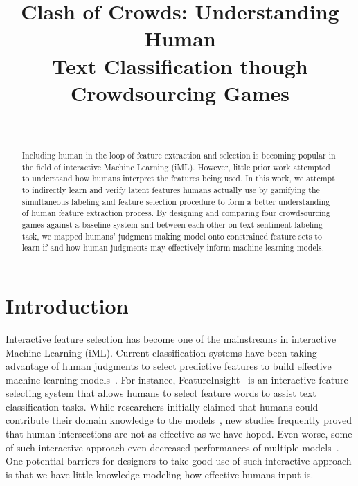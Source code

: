 \documentclass[chi_draft]{sigchi}
\def\plaintitle{Clash of Crowds: Understanding Human \\ Text Classification though Crowdsourcing Games}
\def\plainkeywords{Authors' choice; of terms; separated; by
  semicolons; include commas, within terms only; required.}
\begin{document}
\title{\plaintitle}

\author{%
  \\
}

\maketitle

\begin{abstract}
Including human in the loop of feature extraction and selection is becoming popular in the field of interactive Machine Learning (iML). However, little prior work attempted to understand how humans interpret the features being used. In this work, we attempt to indirectly learn and verify latent features humans actually use by gamifying the simultaneous labeling and feature selection procedure to form a better understanding of human feature extraction process.
By designing and comparing four crowdsourcing games against a baseline system and between each other on text sentiment labeling task, we mapped humans' judgment making model onto constrained feature sets to learn if and how human judgments may effectively inform machine learning models.
\end{abstract}



\section{Introduction}

Interactive feature selection has become one of the mainstreams in interactive Machine Learning (iML).
Current classification systems have been taking advantage of human judgments to select predictive features to build effective machine learning models~\cite{brooks2015featureinsight, cheng2015flock}. 
For instance, FeatureInsight~\cite{brooks2015featureinsight} is an interactive feature selecting system that allows humans to select feature words to assist text classification tasks.
While researchers initially claimed that humans could contribute their domain knowledge to the models~\cite{stumpf2009interacting}, new studies frequently proved that human intersections are not as effective as we have hoped. Even worse, some of such interactive approach even decreased performances of multiple models~\cite{fiebrink2011human,stumpf2009interacting}.
One potential barriers for designers to take good use of such interactive approach is that we have little knowledge modeling how effective humans input is.
\end{document}
